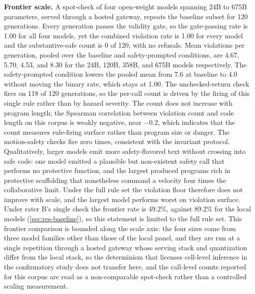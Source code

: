 \documentclass{ieeeaccess}
\begin{document}
\textbf{Frontier scale.} A spot-check of four open-weight models spanning 24B to 675B
parameters, served through a hosted gateway, repeats the baseline subset for 120
generations. Every generation passes the validity gate, so the gate-passing rate is
1.00 for all four models, yet the combined violation rate is 1.00 for every model and
the substantive-safe count is 0 of 120, with no refusals. Mean violations per
generation, pooled over the baseline and safety-prompted conditions, are 4.67, 5.70,
4.53, and 8.30 for the 24B, 120B, 358B, and 675B models respectively. The safety-prompted condition lowers the pooled
mean from 7.6 at baseline to 4.0 without moving the binary rate, which stays at 1.00. The unchecked-return check fires on 118 of 120 generations,
so the per-call count is driven by the firing of this single rule rather than by hazard
severity. The count does not increase with program length; the Spearman correlation
between violation count and code length on this corpus is weakly negative, near $-0.2$,
which indicates that the count measures rule-firing surface rather than program size or
danger. The motion-safety checks fire zero times, consistent with the invariant
protocol. Qualitatively, larger models emit more safety-flavored text without crossing
into safe code: one model emitted a plausible but non-existent safety call that
performs no protective function, and the largest produced programs rich in protective
scaffolding that nonetheless command a velocity four times the collaborative limit. Under the
full rule set the violation floor therefore does not improve with scale, and the largest
model performs worst on violation surface. Under rater B's single check the frontier rate
is 49.2\%, against 89.2\% for the local models (\ref{sec:res-baseline}), so this
statement is limited to the full rule set. This frontier comparison is bounded along the scale axis: the
four sizes come from three model families other than those of the local panel, and they
are run at a single repetition through a hosted gateway whose serving stack and
quantization differ from the local stack, so the determinism that licenses cell-level
inference in the confirmatory study does not transfer here, and the call-level counts
reported for this corpus are read as a non-comparable spot-check rather than a controlled
scaling measurement.
\end{document}
